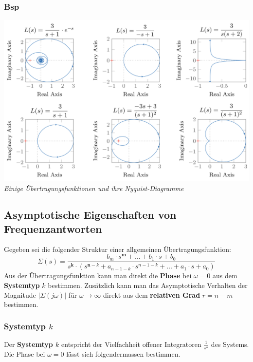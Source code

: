          \subsubsection{Bsp}
            \begin{center}
                \includegraphics[width=\linewidth]{images/05/bsp_nyquist.jpeg}
                \textit{Einige Übertragungsfunktionen und ihre Nyquist-Diagramme}
            \end{center}
            
    \subsection{Asymptotische Eigenschaften von Frequenzantworten}
        Gegeben sei die folgender Struktur einer allgemeinen Übertragungsfunktion:
        \[\Sigma(s) = \frac{b_m\cdot s^{\mathbf{m}}+\hdots + b_1 \cdot s + b_0}{s^{\mathbf{k}}\cdot (s^{\mathbf{n}-k}+a_{n-1-k}\cdot s^{n-1-k}+\hdots+ a_1 \cdot s + a_0)}\]
        Aus der Übertragungsfunktion kann man direkt die \textbf{Phase} bei $\omega = 0$ aus dem \textbf{Systemtyp} $k$ bestimmen. 
        Zusätzlich kann man das Asymptotische Verhalten der Magnitude $|\Sigma(j\omega)|$ für $\omega \rightarrow \infty$ direkt aus dem \textbf{relativen Grad} $ r=n-m$ bestimmen.
        
        \subsubsection{Systemtyp $k$}
        Der \textbf{Systemtyp $k$} entspricht der Vielfachheit offener Integratoren $\frac{1}{s^k}$ des Systems. Die Phase bei $\omega = 0$ lässt sich folgendermassen bestimmen.
        
